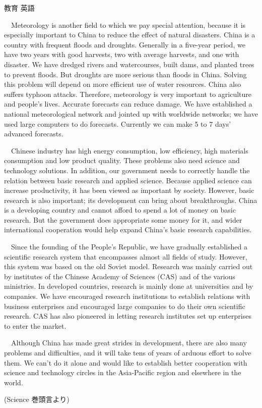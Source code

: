\documentclass[fleqn]{jbook}
\begin{document}
\begin{question}{教育 英語}{}
\begin{subquestions}
  　Meteorology is another field to which we pay special
  attention, because it is especially important to China to reduce 
  the effect of natural disasters. China is a country with
  frequent floods and droughts. Generally in a five-year period,
  we have two years with good harvests, two with average
  harvests, and one with disaster. We have dredged rivers and
  watercourses, built dams, and planted trees to prevent
  floods. But droughts are more serious than floods in
  China. Solving this problem will depend on more efficient use of 
  water resources. China also suffers typhoon attacks. Therefore,
  meteorology is very important to agriculture and people's
  lives. Accurate forecasts can reduce damage. We have established 
  a national meteorological network and jointed up with worldwide
  networks; we have used large computers to do
  forecasts. Currently we can make 5 to 7 days' advanced
  forecasts. 

  　Chinese industry has high energy consumption, low efficiency,
  high materials consumption and low product quality. These
  problems also need science and technology solutions. In
  addition, our government needs to correctly handle the relation
  between basic research and applied science. Because applied
  science can increase productivity, it has been viewed as
  important by society. However, basic research is also important; 
  its development can bring about breakthroughs. China is a
  developing country and cannot afford to spend a lot of money on
  basic research. But the government does appropriate some money
  for it, and wider international cooperation would help expand
  China's basic research capabilities. 

  　Since the founding of the People's Republic, we have gradually
  established a scientific research system that encompasses almost
  all fields of study. However, this system was based on the old
  Soviet model. Research was mainly carried out by institutes of
  the Chinese Academy of Sciences (CAS) and of the various
  ministries. In developed countries, research is mainly done at
  universities and by companies. We have encouraged research
  institutions to establish relations with business enterprises
  and encouraged large companies to do their own scientific
  research. CAS has also pioneered in letting research institutes
  set up enterprises to enter the market.

  　Although China has made great strides in development, there
  are also many problems and difficulties, and it will take tens
  of years of arduous effort to solve them. We can't do it alone
  and would like to establish better cooperation with science and
  technology circles in the Asia-Pacific region and elsewhere in
  the world.
%
  \begin{flushright}
        (Science 巻頭言より)
  \end{flushright}
        

\end{subquestions}
\end{question}
\end{document}
